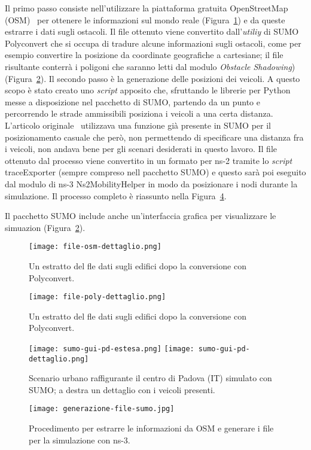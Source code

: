 Il primo passo consiste nell'utilizzare la piattaforma gratuita OpenStreetMap (OSM)~\cite{osmWebsite} per
ottenere le informazioni sul mondo reale (Figura~\ref{fig:esempio-file-osm}) e da queste estrarre i dati sugli ostacoli.
Il file ottenuto viene convertito dall'\textit{utiliy} di SUMO Polyconvert che si occupa di tradure alcune informazioni
sugli ostacoli, come per esempio convertire la posizione da coordinate geografiche a cartesiane;
il file risultante conterrà i poligoni che saranno letti dal modulo \textit{Obstacle Shadowing}) (Figura~\ref{fig:esempio-file-poly}).
Il secondo passo è la generazione delle posizioni dei veicoli.
A questo scopo è stato creato uno \textit{script} apposito che, sfruttando le librerie per Python messe a disposizione
nel pacchetto di SUMO, partendo da un punto e percorrendo le strade ammissibili posiziona i veicoli a una certa distanza.
L'articolo originale~\cite{Carpenter:2015:OMI:2756509.2756512} utilizzava una funzione già presente in SUMO
per il posizionamento casuale che però, non permettendo di specificare una distanza fra i veicoli, non andava bene per gli scenari desiderati in questo lavoro.
%
Il file ottenuto dal processo viene convertito in un formato per ns-2 tramite lo \textit{script} traceExporter (sempre compreso nell pacchetto SUMO)
e questo sarà poi eseguito dal modulo di ns-3 \textsf{Ns2MobilityHelper} in modo da posizionare i nodi durante la simulazione.
Il processo completo è riassunto nella Figura~\ref{fig:generazione-file-sumo}.

Il pacchetto SUMO include anche un'interfaccia grafica per visualizzare le simuazion (Figura~\ref{fig:esempio-file-poly}).
%
\begin{figure}[htbp]
	\centering
		\texttt{[image: file-osm-dettaglio.png]}
\caption{Un estratto del fle dati sugli edifici dopo la conversione con Polyconvert.\label{fig:esempio-file-osm}}
\end{figure}
%
%
\begin{figure}[htbp]
	\centering
		\texttt{[image: file-poly-dettaglio.png]}
\caption{Un estratto del fle dati sugli edifici dopo la conversione con Polyconvert.\label{fig:esempio-file-poly}}
\end{figure}
%
\begin{figure}[htbp]
	\centering
		\texttt{[image: sumo-gui-pd-estesa.png]}
		\hfill
		\texttt{[image: sumo-gui-pd-dettaglio.png]}
\caption{Scenario urbano raffigurante il centro di Padova (IT) simulato con SUMO; a destra un dettaglio con i veicoli presenti.\label{fig:sumo-gui}}
\end{figure}
%
\begin{figure}[htbp]
	\centering
		\texttt{[image: generazione-file-sumo.jpg]}
\caption{Procedimento per estrarre le informazioni da OSM e generare i file per la simulazione con ns-3.\label{fig:generazione-file-sumo}}
\end{figure}
